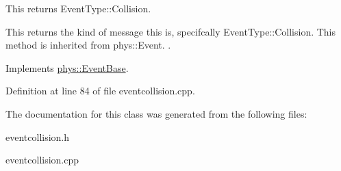 This returns EventType::Collision. 

This returns the kind of message this is, specifcally EventType::Collision. This method is inherited from phys::Event. . 

Implements \hyperlink{classphys_1_1EventBase_a1b3d29b6ecf30f18cc3e1825a515c508}{phys::EventBase}.



Definition at line 84 of file eventcollision.cpp.



The documentation for this class was generated from the following files:\begin{DoxyCompactItemize}
\item 
eventcollision.h\item 
eventcollision.cpp\end{DoxyCompactItemize}
